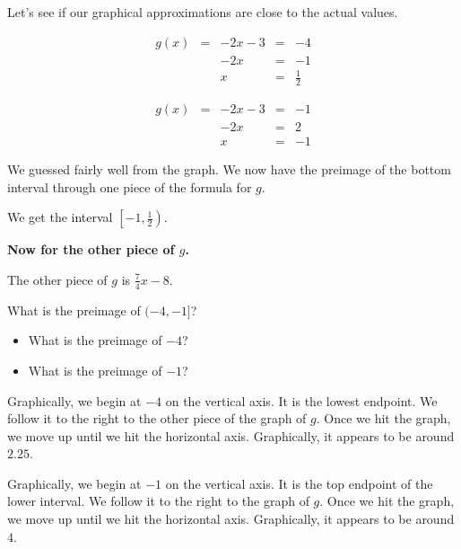 \documentclass{ximera}
\begin{document}
Let's see if our graphical approximations are close to the actual values.




\begin{align*}
g(x) & = & -2x-3  & = & -4 \\
     &   & -2x    & = & -1  \\
     &   & x      & = & \frac{1}{2}
\end{align*}




\begin{align*}
g(x) & = & -2x-3  & = & -1 \\
     &  & -2x    & = & 2  \\
     &   & x      & = & -1
\end{align*}







We guessed fairly well from the graph.  We now have the preimage of the bottom interval through one piece of the formula for $g$.  


We get the interval $\left[ -1, \frac{1}{2} \right)$.


\textbf{Now for the other piece of $g$.}







The other piece of $g$ is $\frac{7}{4}x - 8$. 


What is the preimage of $(-4, -1]$?


\begin{itemize}
\item What is the preimage of $-4$? 
\item What is the preimage of $-1$? 
\end{itemize}



Graphically, we begin at $-4$ on the vertical axis.  It is the lowest endpoint.  We follow it to the right to the other piece of the graph of $g$.  Once we hit the graph, we move up until we hit the horizontal axis.  Graphically, it appears to be around $2.25$.


Graphically, we begin at $-1$ on the vertical axis.  It is the top endpoint of the lower interval.  We follow it to the right to the graph of $g$.  Once we hit the graph, we move up until we hit the horizontal axis.  Graphically, it appears to be around $4$.
\end{document}
